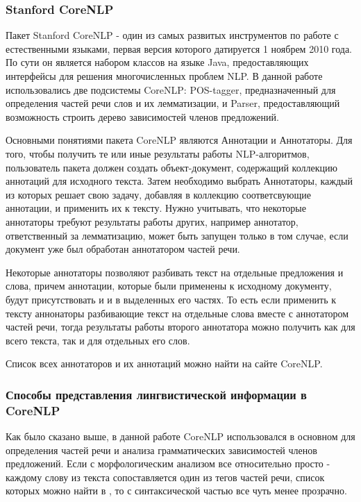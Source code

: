 \subsubsection{Stanford CoreNLP}
Пакет Stanford CoreNLP\cite{corenlp} - один из самых развитых инструментов по работе 
с естественными языками, первая версия которого датируется 1 ноябрем 2010 года.
По сути он является набором классов на языке Java, предоставляющих интерфейсы
для решения многочисленных проблем NLP. В данной работе использовались две подсистемы CoreNLP:
POS-tagger, предназначенный для определения частей речи слов и их лемматизации,
и Parser, предоставляющий возможность строить дерево зависимостей членов предложений.

Основными понятиями пакета CoreNLP являются Аннотации и Аннотаторы. 
Для того, чтобы получить те или иные результаты работы NLP-алгоритмов,
пользователь пакета должен создать объект-документ,
содержащий коллекцию аннотаций для исходного текста. 
Затем необходимо выбрать Аннотаторы, каждый из которых решает свою задачу, 
добавляя в коллекцию соответсвующие аннотации, и применить их к тексту. 
Нужно учитывать, что некоторые аннотаторы требуют результаты работы других,
например аннотатор, ответственный за лемматизацию, может быть запущен
только в том случае, если документ уже был обработан аннотатором частей речи.

Некоторые аннотаторы позволяют разбивать текст на отдельные предложения и слова,
причем аннотации, которые были применены к исходному документу, будут присутствовать и
и в выделенных его частях. 
То есть если применить к тексту аннонаторы разбивающие текст на отдельные слова
вместе с аннотатором частей речи, тогда результаты работы второго аннотатора
можно получить как для всего текста, так и для отдельных его слов.

Список всех аннотаторов и их аннотаций можно найти на сайте CoreNLP\cite{corenlp}.

\subsubsection{Способы представления лингвистической информации в CoreNLP}

Как было сказано выше, в данной работе CoreNLP использовался в основном для 
определения частей речи и анализа грамматических зависимостей
членов предложений.
Если с морфологическим анализом все относительно просто - каждому слову
из текста сопоставляется один из тегов частей речи, список которых можно найти в \cite{treebank},
то с синтаксической частью все чуть менее прозрачно.

